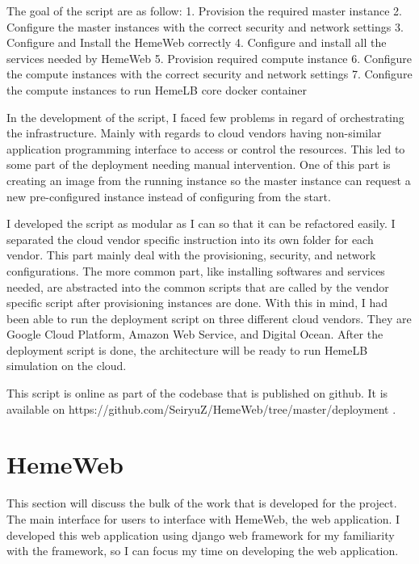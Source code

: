 The goal of the script are as follow:
1. Provision the required master instance
2. Configure the master instances with the correct security and network settings
3. Configure and Install the HemeWeb correctly
4. Configure and install all the services needed by HemeWeb
5. Provision required compute instance
6. Configure the compute instances with the correct security and network settings
7. Configure the compute instances to run HemeLB core docker container

In the development of the script, I faced few problems in regard of orchestrating the infrastructure. Mainly with regards to cloud vendors having non-similar application programming interface to access or control the resources. This led to some part of the deployment needing manual intervention. One of this part is creating an image from the running instance so the master instance can request a new pre-configured instance instead of configuring from the start.

I developed the script as modular as I can so that it can be refactored easily. I separated the cloud vendor specific instruction into its own folder for each vendor. This part mainly deal with the provisioning, security, and network configurations. The more common part, like installing softwares and services needed, are abstracted into the common scripts that are called by the vendor specific script after provisioning instances are done. With this in mind, I had been able to run the deployment script on three different cloud vendors. They are Google Cloud Platform, Amazon Web Service, and Digital Ocean. After the deployment script is done, the architecture will be ready to run HemeLB simulation on the cloud.

This script is online as part of the codebase that is published on github. It is available on https://github.com/SeiryuZ/HemeWeb/tree/master/deployment .


\section{HemeWeb}

This section will discuss the bulk of the work that is developed for the project. The main interface for users to interface with HemeWeb, the web application.  I developed this web application using django web framework for my familiarity with the framework, so I can focus my time on developing the web application.



